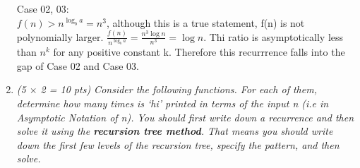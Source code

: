 \documentclass[12pt]{article}
\begin{document}
\begin{enumerate}
{	 Case 02, 03:\\
	$f(n)> n^{\log_b a}=n^3$, although this is a true statement, f(n) is not polynomially larger.
	$\frac{f(n)}{n^{\log_b a}}= \frac{n^3 \log n}{n^3}= \log n$. Thi ratio is asymptotically less than $n^k$ for any positive constant k. Therefore this recurrrence falls into the gap of Case 02 and Case 03.
	}
	\pagebreak
	
	\item{
	\itshape  (5 $\times$ 2 = 10 pts) Consider the following functions. For each of them, determine how many times is ‘hi’ printed in terms of the input n (i.e in Asymptotic Notation of n). You should first write down a recurrence and then
solve it using the \textbf{recursion tree method}. That means you should write down the
first few levels of the recursion tree, specify the pattern, and then solve.
	}
	 

\end{enumerate}
\end{document}
